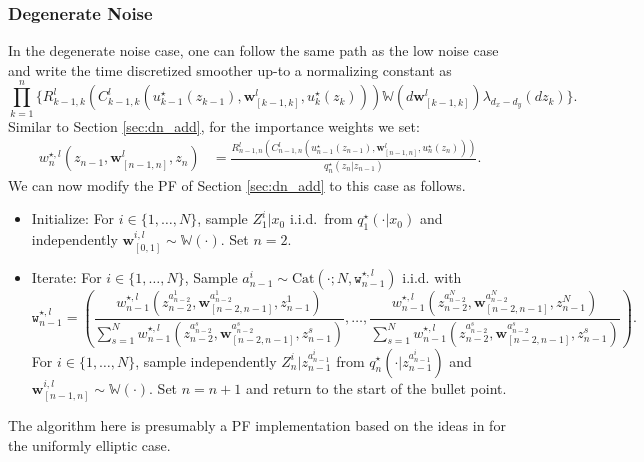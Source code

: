 \documentclass[english,13pt]{article}
\numberwithin{equation}{section}
\begin{document}
\subsubsection{Degenerate Noise}\label{sec:dn_diff}

In the degenerate noise case,  one can follow the same path as the low noise case and write the time discretized smoother
up-to a normalizing constant as
$$
\prod_{k=1}^n\Big\{ 
R_{k-1,k}^l(C_{k-1,k}^l(u_{k-1}^{\star}(z_{k-1}),\mathbf{w}_{[k-1,k]}^l,u_k^{\star}(z_k)))
\mathbb{W}(d\mathbf{w}_{[k-1,k]}^l)
\lambda_{d_x-d_y}(dz_k)
\Big\}.
$$
Similar to Section \ref{sec:dn_add}, for the importance weights we set:
\begin{align*}
w_n^{\star,l}(z_{n-1},\mathbf{w}_{[n-1,n]}^l,z_n)&  = 
\frac{R_{n-1,n}^l(C_{n-1,n}^l(u_{n-1}^{\star}(z_{n-1}),\mathbf{w}_{[n-1,n]}^l,u_n^{\star}(z_n)))
}{q_n^{\star}(z_n|z_{n-1})}.%
\end{align*}
We can now modify the PF of Section \ref{sec:dn_add} to this case as follows.
\begin{itemize}
\item{Initialize: For $i\in\{1,\dots,N\}$,  sample $Z_1^i|x_0$ i.i.d.~from $q_1^{\star}(\cdot|x_0)$ and independently $\mathbf{w}_{[0,1]}^{i,l}\sim\mathbb{W}(\cdot)$. Set $n=2$.}
\item{Iterate: For $i\in\{1,\dots,N\}$,  Sample $a_{n-1}^i\sim\text{Cat}(\cdot;N,\mathtt{w} ^{\star,l}_{n-1})$ i.i.d. with
$$
\mathtt{w} ^{\star,l}_{n-1}=\left(
\frac{w_{n-1}^{\star,l}(z_{n-2}^{a_{n-2}^1},
\mathbf{w}_{[n-2,n-1]}^{a_{n-2}^1},z_{n-1}^1)}
{\sum_{s=1}^N w_{n-1}^{\star,l}(z_{n-2}^{a_{n-2}^s},\mathbf{w}_{[n-2,n-1]}^{a_{n-2}^s},z_{n-1}^s)},\ldots,\frac{w_{n-1}^{\star,l}(z_{n-2}^{a_{n-2}^N},
\mathbf{w}_{[n-2,n-1]}^{a_{n-2}^N},z_{n-1}^N)}
{\sum_{s=1}^N w_{n-1}^{\star,l}(z_{n-2}^{a_{n-2}^s},\mathbf{w}_{[n-2,n-1]}^{a_{n-2}^s},z_{n-1}^s)}\right).
$$
For $i\in\{1,\dots,N\}$,  sample independently $Z_n^i|z_{n-1}^{a_{n-1}^i}$  from $q_n^{\star}(\cdot|z_{n-1}^{a_{n-1}^i})$
and $\mathbf{w}_{[n-1,n]}^{i,l}\sim\mathbb{W}(\cdot)$.
Set $n=n+1$ and return to the start of the bullet point.}
\end{itemize}
The algorithm here is presumably a PF implementation based on the ideas in \cite{bierkens} for the uniformly elliptic case.
\end{document}
